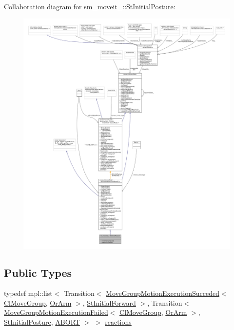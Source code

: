 Collaboration diagram for sm\+\_\+moveit\+\_\+:\+:St\+Initial\+Posture\+:
\nopagebreak
\begin{figure}[H]
\begin{center}
\leavevmode
\includegraphics[width=350pt]{structsm__moveit__2_1_1StInitialPosture__coll__graph}
\end{center}
\end{figure}
\subsection*{Public Types}
\begin{DoxyCompactItemize}
\item 
typedef mpl\+::list$<$ Transition$<$ \hyperlink{structmoveit__z__client_1_1MoveGroupMotionExecutionSucceded}{Move\+Group\+Motion\+Execution\+Succeded}$<$ \hyperlink{classmoveit__z__client_1_1ClMoveGroup}{Cl\+Move\+Group}, \hyperlink{classsm__moveit__2_1_1OrArm}{Or\+Arm} $>$, \hyperlink{structsm__moveit__2_1_1StInitialForward}{St\+Initial\+Forward} $>$, Transition$<$ \hyperlink{structmoveit__z__client_1_1MoveGroupMotionExecutionFailed}{Move\+Group\+Motion\+Execution\+Failed}$<$ \hyperlink{classmoveit__z__client_1_1ClMoveGroup}{Cl\+Move\+Group}, \hyperlink{classsm__moveit__2_1_1OrArm}{Or\+Arm} $>$, \hyperlink{structsm__moveit__2_1_1StInitialPosture}{St\+Initial\+Posture}, \hyperlink{classABORT}{A\+B\+O\+RT} $>$ $>$ \hyperlink{structsm__moveit__2_1_1StInitialPosture_a63b7efb582df2d3a6e8cf2a4d11f5303}{reactions}
\end{DoxyCompactItemize}

